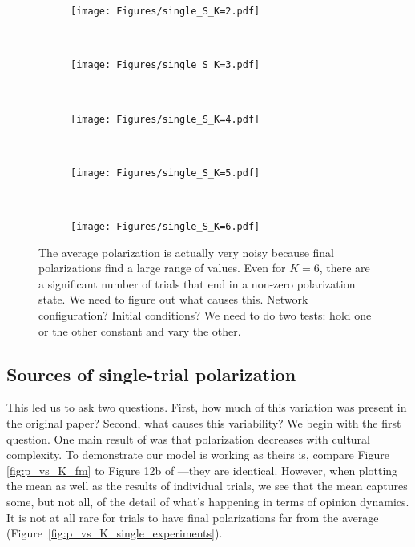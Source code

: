 \documentclass[11pt,letterpaper]{article}
\begin{document}
\begin{figure}[h!]
  \centering
  \begin{subfigure}[t]{\textwidth}
    \centering
    \texttt{[image: Figures/single\_S\_K=2.pdf]}
  \end{subfigure} \\
  \begin{subfigure}[t]{0.49\textwidth}
      \centering
      \texttt{[image: Figures/single\_S\_K=3.pdf]}
  \end{subfigure}
  ~
  \begin{subfigure}[t]{0.49\textwidth}
      \centering
      \texttt{[image: Figures/single\_S\_K=4.pdf]}
  \end{subfigure} \\
  \begin{subfigure}[t]{0.49\textwidth}
      \centering
      \texttt{[image: Figures/single\_S\_K=5.pdf]}
  \end{subfigure}
  ~
  \begin{subfigure}[t]{0.49\textwidth}
      \centering
      \texttt{[image: Figures/single\_S\_K=6.pdf]}
  \end{subfigure}
  \caption{The average polarization is actually very noisy because 
    final polarizations find a large range of values. Even for $K=6$, there
    are a significant number of trials that end in a non-zero polarization
    state. We need to figure out what causes this. Network configuration?
    Initial conditions? We need to do two tests: hold one or the other 
    constant and vary the other.
  }
  \label{fig:single_S_K}
\end{figure}

\subsection{Sources of single-trial polarization}

This led us to ask two questions. First, how much of this variation was 
present in the original  paper? Second, what causes
this variability? We begin with the first question. One main result of
 was that polarization decreases with cultural complexity.
To demonstrate our model is working as theirs is, compare Figure 
\ref{fig:p_vs_K_fm} to Figure 12b of ---they are identical.
However, when plotting the mean as well as the results of individual trials,
we see that the mean captures some, but not all, of the detail of what's 
happening in terms of opinion dynamics. It is not at all rare for trials to
have final polarizations far from the average 
(Figure~\ref{fig:p_vs_K_single_experiments}). 
\end{document}
